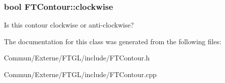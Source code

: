 \subsubsection[{\texorpdfstring{clockwise}{clockwise}}]{\setlength{\rightskip}{0pt plus 5cm}bool F\+T\+Contour\+::clockwise\hspace{0.3cm}{\ttfamily [private]}}\hypertarget{class_f_t_contour_a67428b983bf4c5d0c5101ec382c92bac}{}\label{class_f_t_contour_a67428b983bf4c5d0c5101ec382c92bac}
Is this contour clockwise or anti-\/clockwise? 

The documentation for this class was generated from the following files\+:\begin{DoxyCompactItemize}
\item 
Commun/\+Externe/\+F\+T\+G\+L/include/F\+T\+Contour.\+h\item 
Commun/\+Externe/\+F\+T\+G\+L/include/F\+T\+Contour.\+cpp\end{DoxyCompactItemize}
